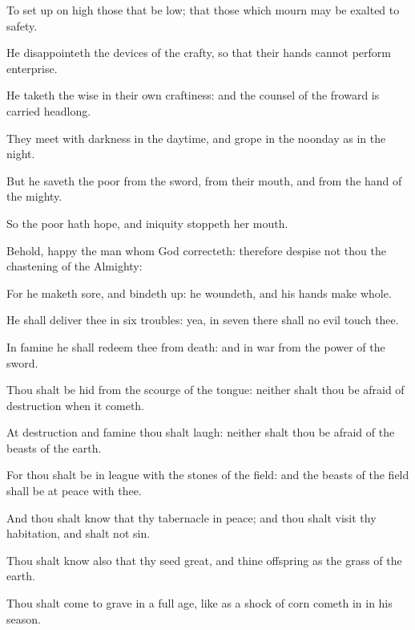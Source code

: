 {To set
up on
high those that be
low; that those which
mourn may be
exalted to
safety.

He
disappointeth the
devices of the
crafty, so that their
hands cannot
perform
{}
enterprise.

He
taketh the
wise in their own
craftiness: and the
counsel of the
froward is carried
headlong.

They
meet with
darkness in the
daytime, and
grope in the
noonday as in the
night.

But he
saveth the
poor from the
sword, from their
mouth, and from the
hand of the
mighty.

So the
poor hath
hope, and
iniquity
stoppeth her
mouth.


\par }{\PP {}Behold,
happy
{} the
man whom
God
correcteth: therefore
despise not thou the
chastening of the
Almighty:

For he maketh
sore, and bindeth
up: he
woundeth, and his
hands make
whole.

He shall
deliver thee in
six
troubles: yea, in
seven there shall no
evil
touch thee.

In
famine he shall
redeem thee from
death: and in
war from the
power of the
sword.

Thou shalt be
hid from the
scourge of the
tongue: neither shalt thou be
afraid of
destruction when it
cometh.

At
destruction and
famine thou shalt
laugh: neither shalt thou be
afraid of the
beasts of the
earth.

For thou shalt be in
league with the
stones of the
field: and the
beasts of the
field shall be at
peace with thee.

And thou shalt
know that thy
tabernacle
{} in
peace; and thou shalt
visit thy
habitation, and shalt not
sin.

Thou shalt
know also that thy
seed
{}
great, and thine
offspring as the
grass of the
earth.

Thou shalt
come to
{}
grave in a full
age, like as a shock of
corn cometh
in in his
season.

}
